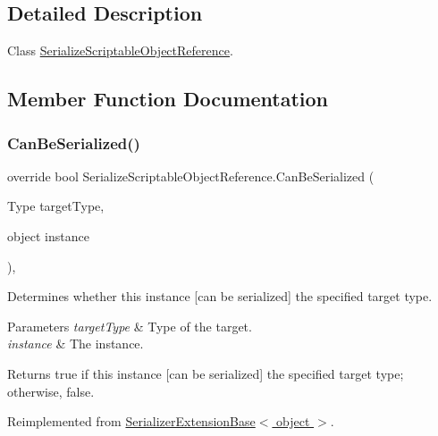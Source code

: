 \subsection{Detailed Description}
Class \hyperlink{class_serialize_scriptable_object_reference}{Serialize\+Scriptable\+Object\+Reference}. 



\subsection{Member Function Documentation}
\mbox{\label{class_serialize_scriptable_object_reference_a830bb74938329482397d7975b8853eaf}} 
\subsubsection{\texorpdfstring{Can\+Be\+Serialized()}{CanBeSerialized()}}
{\footnotesize\ttfamily override bool Serialize\+Scriptable\+Object\+Reference.\+Can\+Be\+Serialized (\begin{DoxyParamCaption}\item[{Type}]{target\+Type,  }\item[{object}]{instance }\end{DoxyParamCaption})\hspace{0.3cm}{\ttfamily [inline]}, {\ttfamily [virtual]}}



Determines whether this instance \mbox{[}can be serialized\mbox{]} the specified target type. 


\begin{DoxyParams}{Parameters}
{\em target\+Type} & Type of the target.\\
\hline
{\em instance} & The instance.\\
\hline
\end{DoxyParams}
\begin{DoxyReturn}{Returns}
{\ttfamily true} if this instance \mbox{[}can be serialized\mbox{]} the specified target type; otherwise, {\ttfamily false}.
\end{DoxyReturn}


Reimplemented from \hyperlink{class_serializer_extension_base_a50e69037fda6bdcc080cdc3c51d25b99}{Serializer\+Extension\+Base$<$ object $>$}.

